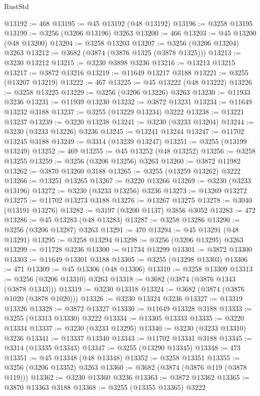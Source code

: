 \begin{lexlean}{RustStd}
\begin{coremodule}
{\begin{coremodule}
{{{{{{{{{{{{{{{{{{{{{{{{{{{{{{{{{{{{{@13192 := 468
@13195 := @45 @13192 (@48 @13192)
@13196 := @3258 @13195
@13199 := @3256 (@3206 @13196) @3263
@13200 := 466
@13203 := @45 @13200 (@48 @13200)
@13204 := @3258 @13203
@13207 := @3256 (@3206 @13204) @3263
@13212 := @3682 (@3874 (@3876 @1325 (@3878 @1325)))
@13213 := @3230 @13212
@13215 := @3230 @3898 @3236
@13216 := @13213 @13215
@13217 := @3872 @13216
@13219 := @11649 @13217 @3188
@13221 := @3255 (@13207 @13219)
@13222 := 467
@13225 := @45 @13222 (@48 @13222)
@13226 := @3258 @13225
@13229 := @3256 (@3206 @13226) @3263
@13230 := @11933 @3236
@13231 := @11939 @13230
@13232 := @3872 @13231
@13234 := @11649 @13232 @3188
@13237 := @3255 (@13229 @13234) @3222
@13238 := @13221 @13237
@13239 := @3220 @13238
@13241 := @3230 (@3233 @13204)
@13244 := @3230 (@3233 @13226) @3236
@13245 := @13241 @13244
@13247 := @11702 @13245 @3188
@13249 := @3314 (@13239 @13247)
@13251 := @3255 (@13199 @13249)
@13252 := 469
@13255 := @45 @13252 (@48 @13252)
@13256 := @3258 @13255
@13259 := @3256 (@3206 @13256) @3263
@13260 := @3872 @11982
@13262 := @3870 @13260 @3188
@13265 := @3255 (@13259 @13262) @3222
@13266 := @13251 @13265
@13267 := @3220 @13266
@13269 := @3230 (@3233 @13196)
@13272 := @3230 (@3233 @13256) @3236
@13273 := @13269 @13272
@13275 := @11702 @13273 @3188
@13276 := @13267 @13275
@13278 := @3040 (@13191 @13276)
@13282 := @3197 (@3200 @1137) @3856 @3052
@13283 := 472
@13286 := @45 @13283 (@48 @13283)
@13287 := @3258 @13286
@13290 := @3256 (@3206 @13287) @3263
@13291 := 470
@13294 := @45 @13291 (@48 @13291)
@13295 := @3258 @13294
@13298 := @3256 (@3206 @13295) @3263
@13299 := @11728 @3236
@13300 := @11734 @13299
@13301 := @3872 @13300
@13303 := @11649 @13301 @3188
@13305 := @3255 (@13298 @13303)
@13306 := 471
@13309 := @45 @13306 (@48 @13306)
@13310 := @3258 @13309
@13313 := @3256 (@3206 @13310) @3263
@13318 := @3682 (@3874 (@3876 @1343 (@3878 @1343)))
@13319 := @3230 @13318
@13324 := @3682 (@3874 (@3876 @1020 (@3878 @1020)))
@13326 := @3230 @13324 @3236
@13327 := @13319 @13326
@13328 := @3872 @13327
@13330 := @11649 @13328 @3188
@13333 := @3255 (@13313 @13330) @3222
@13334 := @13305 @13333
@13335 := @3220 @13334
@13337 := @3230 (@3233 @13295)
@13340 := @3230 (@3233 @13310) @3236
@13341 := @13337 @13340
@13343 := @11702 @13341 @3188
@13345 := @3314 (@13335 @13343)
@13347 := @3255 (@13290 @13345)
@13348 := 473
@13351 := @45 @13348 (@48 @13348)
@13352 := @3258 @13351
@13355 := @3256 (@3206 @13352) @3263
@13360 := @3682 (@3874 (@3876 @119 (@3878 @119)))
@13362 := @3230 @13360 @3236
@13363 := @3872 @13362
@13365 := @3870 @13363 @3188
@13368 := @3255 (@13355 @13365) @3222
}}}}}}}}}}}}}}}}}}}}}}}}}}}}}}}}}}}}}
\end{coremodule}}
\end{coremodule}
\end{lexlean}
